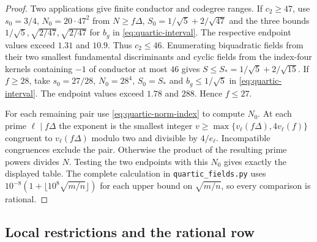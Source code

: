 \documentclass[11pt,a4paper]{article}
\numberwithin{equation}{section}
\begin{document}
\begin{proof}
Two applications give finite conductor and codegree ranges. If $c_2\ge47$, use $s_0=3/4$, $N_0=20\cdot47^2$ from $N\ge f\Delta$, $S_0=1/\sqrt5+2/\sqrt{47}$ and the three bounds $1/\sqrt5,\sqrt{2/47},\sqrt{2/47}$ for $b_g$ in \eqref{eq:quartic-interval}. The respective endpoint values exceed $1.31$ and $10.9$. Thus $c_2\le46$. Enumerating biquadratic fields from their two smallest fundamental discriminants and cyclic fields from the index-four kernels containing $-1$ of conductor at most $46$ gives
$S\le S_* =1/\sqrt5+2/\sqrt{15}$. If $f\ge28$, take $s_0=27/28$, $N_0=28^4$, $S_0=S_*$ and $b_g\le1/\sqrt5$ in \eqref{eq:quartic-interval}. The endpoint values exceed $1.78$ and $288$. Hence $f\le27$.

For each remaining pair use \eqref{eq:quartic-norm-index} to compute $N_0$. At each prime $\ell\mid f\Delta$ the exponent is the smallest integer $v\ge\max\{v_\ell(f\Delta),4v_\ell(f)\}$ congruent to $v_\ell(f\Delta)$ modulo two and divisible by $4/e_\ell$. Incompatible congruences exclude the pair. Otherwise the product of the resulting prime powers divides $N$. Testing the two endpoints with this $N_0$ gives exactly the displayed table. The complete calculation in \texttt{quartic\_fields.py} uses $10^{-8}(1+\lfloor10^8\sqrt{m/n}\rfloor)$ for each upper bound on $\sqrt{m/n}$, so every comparison is rational.
\end{proof}


\subsection{Local restrictions and the rational row}
\end{document}
